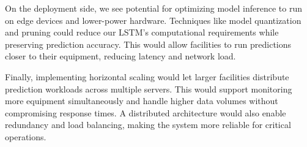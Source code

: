 On the deployment side, we see potential for optimizing model inference to run on edge devices and lower-power hardware. Techniques like model quantization and pruning could reduce our LSTM's computational requirements while preserving prediction accuracy. This would allow facilities to run predictions closer to their equipment, reducing latency and network load.

Finally, implementing horizontal scaling would let larger facilities distribute prediction workloads across multiple servers. This would support monitoring more equipment simultaneously and handle higher data volumes without compromising response times. A distributed architecture would also enable redundancy and load balancing, making the system more reliable for critical operations.